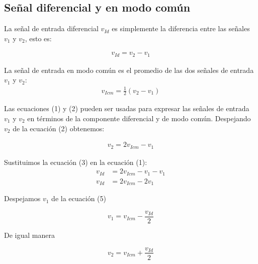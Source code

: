 \documentclass[12pt]{article}
\begin{document}
	\subsection*{Señal diferencial y en modo común}
	La señal de entrada diferencial $v_{Id}$ es simplemente la diferencia entre las señales $v_1$ y $v_2$, esto es:
	
	\begin{align}
		v_{Id} = v_2 - v_1
	\end{align}
	
	La señal de entrada en modo común es el promedio de las dos señales de entrada $v_1$ y $v_2$:
	\begin{align}
		v_{Icm} = \frac{1}{2}(v_2 - v_1)
	\end{align}
	
	Las ecuaciones (1) y (2) pueden ser usadas para expresar las señales de entrada $v_1$ y $v_2$ en términos de la componente diferencial y de modo común. Despejando $v_2$ de la ecuación (2) obtenemos:
	
	\begin{align}
		v_2 = 2v_{Icm} - v_1
	\end{align}
	
	Sustituimos la ecuación (3) en la ecuación (1):
	\begin{align}
		v_{Id} &= 2v_{Icm} - v_1 - v_1\\
		v_{Id} &= 2v_{Icm} - 2v_1
	\end{align}
	
	Despejamos $v_1$ de la ecuación (5)
	\begin{tcolorbox}[colback=red!5!white,colframe=red!75!black,arc=0mm,boxrule=0mm,width=(\linewidth+0.5cm)]
		\begin{equation}
			v_1 = v_{Icm} - \frac{v_{Id}}{2}
		\end{equation}
	\end{tcolorbox}

	De igual manera
	\begin{tcolorbox}[colback=red!5!white,colframe=red!75!black,arc=0mm,boxrule=0mm,width=(\linewidth+0.5cm)]
		\begin{equation}
			v_2 = v_{Icm} + \frac{v_{Id}}{2}
		\end{equation}
	\end{tcolorbox}
	
\end{document}
